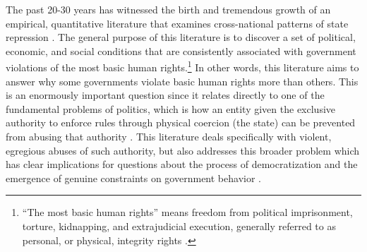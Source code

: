 \documentclass[12pt]{article}
\begin{document}
The past 20-30 years has witnessed the birth and tremendous growth of an empirical, quantitative literature that examines cross-national patterns of state repression \citep[See, e.g.,][]{Stohletal1986, Park1987, McCormickMitchell1988, Henderson1991, Henderson1993, PoeTate1994, Davenport1995, Fein1995, Davenport1999, CingranelliRichards1999isq, Keith1999, Poeetal1999, Apodaca2001, RichardsGellenySacko2001,  Hathaway2002, Keith2002PRQ, DavenportArmstrong2004, BDMetal2005, HafnerBurton2005jpr, HafnerBurtonTsutsui2005, Davenport2007AR, Davenport2007, KeithTatePoe2009, CingranelliFilippov2010, ConradMoore2010}. The general purpose of this literature is to discover a set of political, economic, and social conditions that are consistently associated with government violations of the most basic human rights.\footnote{``The most basic human rights'' means freedom from political imprisonment, torture, kidnapping, and extrajudicial execution, generally referred to as personal, or physical, integrity rights \citep[See, e.g.][]{PoeTate1994, CingranelliRichards1999isq}.} In other words, this literature aims to answer why some governments violate basic human rights more than others. This is an enormously important question since it relates directly to one of the fundamental problems of politics, which is how an entity given the exclusive authority to enforce rules through physical coercion (the state) can be prevented from abusing that authority \citep[See, e.g.,][]{Moore2010}. This literature deals specifically with violent, egregious abuses of such authority, but also addresses this broader problem which has clear implications for questions about the process of democratization and the emergence of genuine constraints on government behavior \citep[E.g.,][]{NorthWeingast1989,Weingast1997}.
\end{document}
